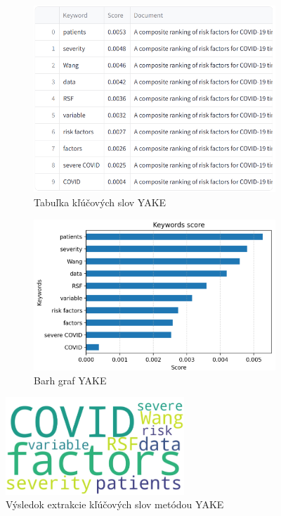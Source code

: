 \documentclass[a4paper,12pt]{article}
\begin{document}

\begin{figure}[htbp]
    \centering
    \begin{subfigure}{0.45\textwidth}
        \includegraphics[width=\textwidth]{../images/yake_table.png}
        \caption{Tabuľka kľúčových slov YAKE}
    \end{subfigure}
    \hfill
    \begin{subfigure}{0.45\textwidth}
        \includegraphics[width=\textwidth]{../images/yake_barh.png}
        \caption{Barh graf YAKE}
    \end{subfigure}

    \vspace{0.5cm}

    \includegraphics[width=0.6\textwidth]{../images/yake_wordcloud.png}
    \caption{Výsledok extrakcie kľúčových slov metódou YAKE}
    \label{fig:yake}
\end{figure}
\end{document}
